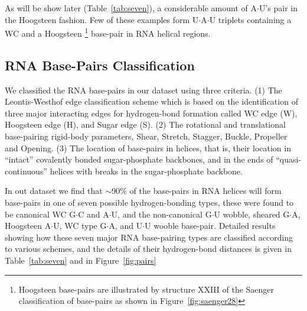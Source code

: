 As will  be show later (Table~\ref{tab:seven}),  a considerable amount
of A$\cdot$U's  pair in the  Hoogsteen fashion. Few of  these examples
form    U$\cdot$A$\cdot$U   triplets   containing    a   WC    and   a
Hoogsteen \footnote{Hoogsteen base-pairs  are illustrated by structure
  XXIII  of  the Saenger  classification  of  base-pairs  as shown  in
  Figure~\ref{fig:saenger28}} base-pair in RNA helical regions.

\subsection{RNA Base-Pairs Classification}
We classified the RNA base-pairs  in our dataset using three criteria.
(1) The Leontis-Westhof  edge classification scheme \cite{leontis1998}
which is based on the  identification of three major interacting edges
for hydrogen-bond  formation called WC  edge (W), Hoogsteen  edge (H),
and Sugar edge (S).  (2) The rotational and translational base-pairing
rigid-body parameters, Shear,  Stretch, Stagger, Buckle, Propeller and
Opening.  (3)  The location of  base-pairs in helices, that  is, their
location  in ``intact''  covalently bonded  sugar-phosphate backbones,
and in  the ends  of ``quasi-continuous'' helices  with breaks  in the
sugar-phosphate backbone.

In  out dataset  we  find that  $\sim$90\%  of the  base-pairs in  RNA
helices will form base-pairs in one of seven possible hydrogen-bonding
types, these  were found to  be canonical WC G$\cdot$C  and A$\cdot$U,
and the  non-canonical G$\cdot$U wobble,  sheared G$\cdot$A, Hoogsteen
A$\cdot$U, WC type G$\cdot$A, and U$\cdot$U wooble base-pair. Detailed
results  showing how  these  seven major  RNA  base-pairing types  are
classified  according to  various schemes,  and the  details  of their
hydrogen-bond  distances  is  given  in Table~\ref{tab:seven}  and  in
Figure~\ref{fig:pairs}

